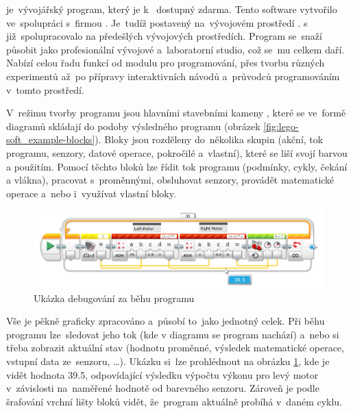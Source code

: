 % 
% 
%
%
%
%
\legoSW{} je~vývojářský program, který je k~\EVthree{} dostupný zdarma. 
Tento  software vytvořilo \lego{} ve~spolupráci s~firmou \NI{}. 
Je~tudíž postavený na~vývojovém prostředí \labview{}. 
\lego{} s~\NI{} již~spolupracovalo na předešlých vývojových prostředích. %
Program se~snaží působit jako profesionální vývojové a~laboratorní studio, což se~mu celkem daří.
Nabízí celou řadu funkcí od modulu pro programování, přes tvorbu různých experimentů až~po přípravy interaktivních návodů a~průvodců programováním v~tomto prostředí.



V~režimu tvorby programu jsou hlavními stavebními kameny \EVblocks, které se ve~formě diagramů skládají do podoby výsledného programu (obrázek \ref{fig:lego-soft_example-blocks}).
Bloky jsou rozděleny do~několika skupin (akční, tok programu, senzory, datové operace, pokročilé a~vlastní), které se liší svojí barvou a použitím. 
Pomocí těchto bloků lze řídit tok programu (podmínky, cykly, čekání a vlákna), pracovat s~proměnnými, obsluhovat senzory, provádět matematické operace a~nebo i~využívat vlastní bloky.

\begin{figure}[h]
	\centering
	\includegraphics[width=\textwidth]{images/lego-soft/lego-soft_live-debuging_line-advance.png}
	\caption{Ukázka debugování za běhu programu}
	\label{fig:lego-soft_live-debuging_line-advance}
\end{figure}

Vše je pěkně graficky zpracováno a~působí to~jako jednotný celek. 
% 
% 
Při běhu programu lze~sledovat jeho tok (kde v diagramu se program nachází) a~nebo si třeba zobrazit aktuální stav (hodnotu proměnné, výsledek matematické operace, vstupní data ze~senzoru, \dots). 
% 
% 
% 
% 
Ukázku si~lze prohlédnout na obrázku \ref{fig:lego-soft_live-debuging_line-advance}, kde je vidět hodnota 39.5, odpovídající výsledku výpočtu výkonu pro levý motor v~závislosti na~naměřené hodnotě od barevného senzoru.
Zároveň je podle šrafování vrchní lišty bloků vidět, že~program aktuálně probíhá v~daném cyklu.

